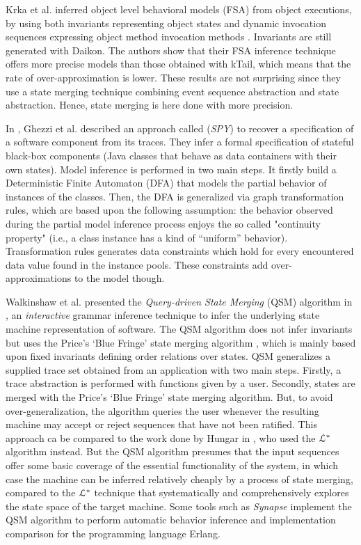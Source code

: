 Krka et al. inferred object level behavioral models (FSA) from object executions, by using both invariants representing object states and dynamic invocation sequences expressing object method invocation methods \cite{Krka:2010:UDE:1810295.1810324}. Invariants are still generated with Daikon. The authors show that their FSA inference technique offers more precise models than those obtained with kTail, which means that the rate of over-approximation is lower. These results are not surprising since they use a state merging technique combining event sequence abstraction and state abstraction. Hence, state merging is here done with more precision.

In \cite{Ghezzi:2009:SIB:1555001.1555057}, Ghezzi et al.
described an approach called (\textit{SPY}) to recover a specification
of a software component from its traces. They infer a formal specification of stateful black-box
components (Java classes that behave as data containers with their own states). Model inference is performed in two main steps. It firstly build a Deterministic Finite Automaton (DFA) that models the partial behavior of instances of the classes. Then, the DFA is generalized via graph transformation rules, which are based upon the following assumption: the behavior observed during the partial model inference process enjoys the so called "continuity property" (i.e., a class instance has a kind of “uniform” behavior). Transformation rules generates data constraints which hold for every encountered data value found in the instance pools. These constraints add over-approximations to the model though.

Walkinshaw et al. presented the \textit{Query-driven State Merging} (QSM) algorithm in
\cite{Walkinshaw07reverseengineering}, an \textit{interactive}
grammar inference technique to infer the underlying state machine
representation of software. The QSM algorithm does not infer invariants but uses the Price’s ‘Blue Fringe’ state
merging algorithm \cite{Lang:1998:RAO:645517.655780}, which is mainly based upon fixed invariants defining order relations over states.
QSM generalizes a supplied trace set obtained from an application with two main steps. Firstly, a trace abstraction is performed with functions given by a user. Secondly, states are merged with the Price’s ‘Blue Fringe’ state
merging algorithm. But, to avoid over-generalization, the algorithm queries the user  whenever the
resulting machine may accept or reject sequences that have
not been ratified. This approach ca be compared to the work done by Hungar in \cite{hungar},
who used the $\EuScript{L}^*$ algorithm instead. But the QSM
algorithm presumes that the input sequences offer some basic
coverage of the essential functionality of the system, in which
case the machine can be inferred relatively cheaply by a process
of state merging, compared to the $\EuScript{L}^*$ technique that
systematically and comprehensively explores the state space of the
target machine. Some tools such as \textit{Synapse}
\cite{LamelaSeijas:2014:SAB:2633448.2633457} implement the QSM
algorithm to perform automatic behavior inference and
implementation comparison for the programming language Erlang.

